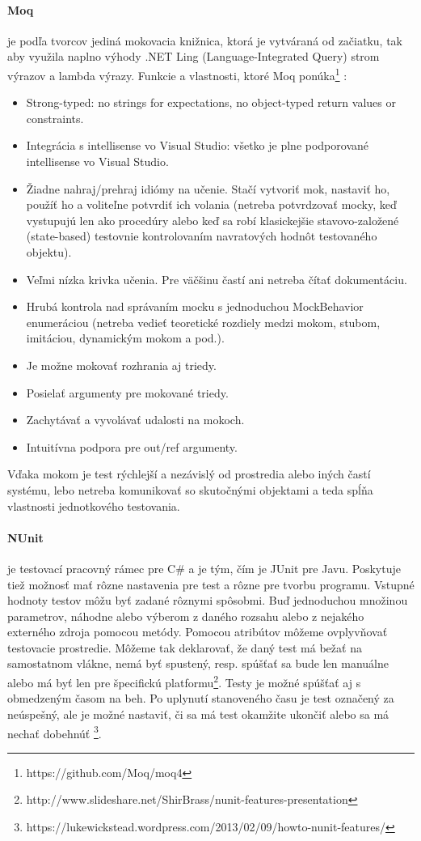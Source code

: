 \documentclass[11pt,twoside,slovak,a4paper]{article}
\begin{document}
			\paragraph{Moq} je podľa tvorcov jediná mokovacia knižnica, ktorá je vytváraná od začiatku, tak aby využila naplno výhody .NET Ling (Language-Integrated Query) strom výrazov a lambda výrazy. 
			Funkcie a vlastnosti, ktoré Moq ponúka\footnote{https://github.com/Moq/moq4} :	
			\begin{itemize}
				\item Strong-typed: no strings for expectations, no object-typed return values or constraints.
				\item Integrácia s intellisense vo Visual Studio: všetko je plne podporované intellisense vo Visual Studio.
				\item Žiadne nahraj/prehraj idiómy na učenie. Stačí vytvoriť mok, nastaviť ho, použíť ho a voliteľne potvrdiť ich volania (netreba potvrdzovať mocky, keď vystupujú len ako procedúry alebo keď sa robí klasickejšie stavovo-založené (state-based) testovnie kontrolovaním navratových hodnôt testovaného objektu).
				\item Veľmi nízka krivka učenia. Pre väčšinu častí ani netreba čítať dokumentáciu.
				\item Hrubá kontrola nad správaním mocku s jednoduchou MockBehavior enumeráciou (netreba vedieť teoretické rozdiely medzi mokom, stubom, imitáciou, dynamickým mokom a pod.).
				\item Je možne mokovať rozhrania aj triedy.
				\item Posielať argumenty pre mokované triedy.
				\item Zachytávať a vyvolávať udalosti na mokoch.
				\item Intuitívna podpora pre out/ref argumenty. 
			\end{itemize}
			Vďaka mokom je test rýchlejší a nezávislý od prostredia alebo iných častí systému, lebo netreba komunikovať so skutočnými objektami a teda spĺňa vlastnosti jednotkového testovania.
			
		\paragraph{NUnit} je testovací pracovný rámec pre C\# a je tým, čím je JUnit pre Javu.
		Poskytuje tiež možnosť mať rôzne nastavenia pre test a rôzne pre tvorbu programu.
		Vstupné hodnoty testov môžu byť zadané rôznymi spôsobmi. Buď jednoduchou množinou parametrov, náhodne alebo výberom z daného rozsahu alebo z nejakého externého zdroja pomocou metódy.
		Pomocou atribútov môžeme ovplyvňovať testovacie prostredie. Môžeme tak deklarovať, že daný test má bežať na samostatnom vlákne, nemá byť spustený, resp. spúšťať sa bude len manuálne alebo má byť len pre špecifickú platformu\footnote{http://www.slideshare.net/ShirBrass/nunit-features-presentation}.
		Testy je možné spúšťať aj s obmedzeným časom na beh. Po uplynutí stanoveného času je test označený za neúspešný, ale je možné nastaviť, či sa má test okamžite ukončiť alebo sa má nechať dobehnúť \footnote{https://lukewickstead.wordpress.com/2013/02/09/howto-nunit-features/}.
		
\end{document}
